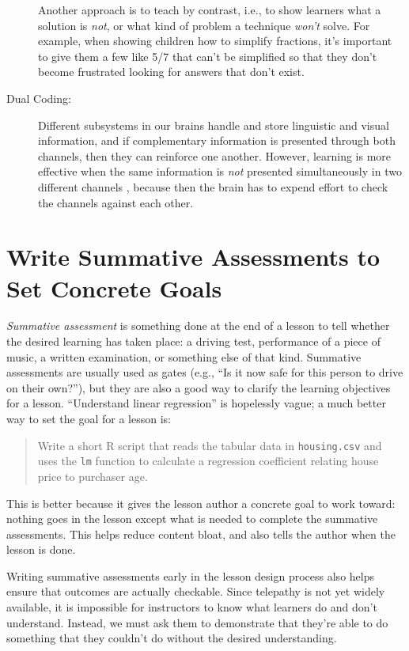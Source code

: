 \documentclass[10pt,letterpaper]{article}
\newcommand{\rulemajor}[1]{\section{#1}}
\begin{document}
\begin{description}
  Another approach is to teach by contrast, i.e., to show learners what a
  solution is \emph{not}, or what kind of problem a technique \emph{won't}
  solve. For example, when showing children how to simplify fractions, it's
  important to give them a few like 5/7 that can't be simplified so that they
  don't become frustrated looking for answers that don't exist.

\item[Dual Coding:] Different subsystems in our brains handle and store
  linguistic and visual information, and if complementary information is
  presented through both channels, then they can reinforce one another. However,
  learning is more effective when the same information is \emph{not} presented
  simultaneously in two different channels \cite{Maye2003,Maye2009}, because
  then the brain has to expend effort to check the channels against each other.

\end{description}

\rulemajor{Write Summative Assessments to Set Concrete Goals}

\emph{Summative assessment} is something done at the end of a lesson to tell
whether the desired learning has taken place: a driving test, performance of a
piece of music, a written examination, or something else of that kind.
Summative assessments are usually used as gates (e.g., ``Is it now safe for this
person to drive on their own?''), but they are also a good way to clarify the
learning objectives for a lesson.  ``Understand linear regression'' is
hopelessly vague; a much better way to set the goal for a lesson is:

\begin{quotation}

  \noindent
  Write a short R script that reads the tabular data in \texttt{housing.csv}
  and uses the \texttt{lm} function to calculate a regression coefficient
  relating house price to purchaser age.

\end{quotation}

This is better because it gives the lesson author a concrete goal to work
toward: nothing goes in the lesson except what is needed to complete the
summative assessments.  This helps reduce content bloat, and also tells the
author when the lesson is done.

Writing summative assessments early in the lesson design process also helps
ensure that outcomes are actually checkable.  Since telepathy is not yet widely
available, it is impossible for instructors to know what learners do and don't
understand.  Instead, we must ask them to demonstrate that they're able to do
something that they couldn't do without the desired understanding.
\end{document}
